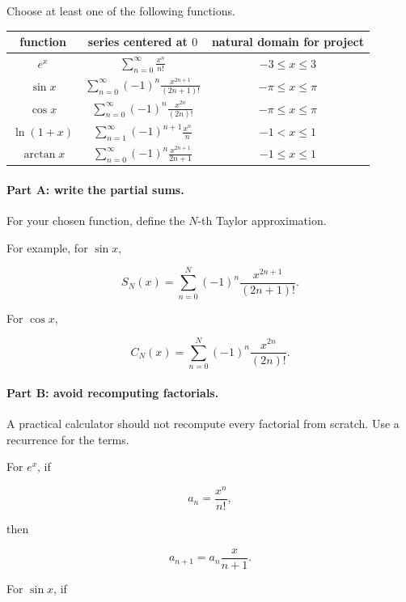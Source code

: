 Choose at least one of the following functions.

\begin{center}
\renewcommand{\arraystretch}{1.45}
\begin{tabular}{c|c|c}
\textbf{function} & \textbf{series centered at \(0\)} & \textbf{natural domain for project} \\ \hline
\(e^x\) &
\(\displaystyle \sum_{n=0}^{\infty}\frac{x^n}{n!}\) &
\(-3\le x\le3\) \\

\(\sin x\) &
\(\displaystyle \sum_{n=0}^{\infty}(-1)^n\frac{x^{2n+1}}{(2n+1)!}\) &
\(-\pi\le x\le\pi\) \\

\(\cos x\) &
\(\displaystyle \sum_{n=0}^{\infty}(-1)^n\frac{x^{2n}}{(2n)!}\) &
\(-\pi\le x\le\pi\) \\

\(\ln(1+x)\) &
\(\displaystyle \sum_{n=1}^{\infty}(-1)^{n+1}\frac{x^n}{n}\) &
\(-1<x\le1\) \\

\(\arctan x\) &
\(\displaystyle \sum_{n=0}^{\infty}(-1)^n\frac{x^{2n+1}}{2n+1}\) &
\(-1\le x\le1\)
\end{tabular}
\end{center}

\paragraph{Part A: write the partial sums.}
For your chosen function, define the \(N\)-th Taylor approximation.

For example, for \(\sin x\),

\[
S_N(x)
=
\sum_{n=0}^{N}
(-1)^n\frac{x^{2n+1}}{(2n+1)!}.
\]

For \(\cos x\),

\[
C_N(x)
=
\sum_{n=0}^{N}
(-1)^n\frac{x^{2n}}{(2n)!}.
\]

\paragraph{Part B: avoid recomputing factorials.}
A practical calculator should not recompute every factorial from scratch.  Use a recurrence
for the terms.

For \(e^x\), if

\[
a_n=\frac{x^n}{n!},
\]

then

\[
\boxed{
a_{n+1}=a_n\frac{x}{n+1}.
}
\]

For \(\sin x\), if

